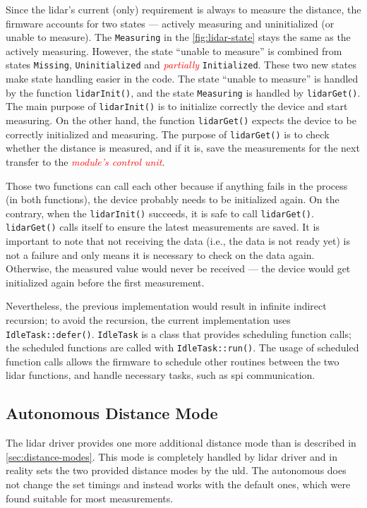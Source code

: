 \documentclass[
  digital,     %
  oneside,     %
  nosansbold,  %
  nocolorbold, %
  nolof,         %
  nolot,         %
]{fithesis4}
\newcommand{\TODO}[1]{\textcolor{red}{\textit{#1}}}
\begin{document}
{{{Since the \acrshort{lidar}'s current (only) requirement is always to measure the distance, the firmware accounts for two states --- actively measuring and uninitialized (or unable to measure). The \verb|Measuring| in the \autoref{fig:lidar-state} stays the same as the actively measuring. However, the state ``unable to measure'' is combined from states \verb|Missing|, \verb|Uninitialized| and \TODO{partially} \verb|Initialized|. These two new states make state handling easier in the code. The state ``unable to measure'' is handled by the function \lstinline|lidarInit()|, and the state \verb|Measuring| is handled by \lstinline|lidarGet()|. The main purpose of \lstinline|lidarInit()| is to initialize correctly the device and start measuring. On the other hand, the function \lstinline|lidarGet()| expects the device to be correctly initialized and measuring. The purpose of \lstinline|lidarGet()| is to check whether the distance is measured, and if it is, save the measurements for the next transfer to the \TODO{module's control unit}.

Those two functions can call each other because if anything fails in the process (in both functions), the device probably needs to be initialized again. On the contrary, when the \lstinline|lidarInit()| succeeds, it is safe to call \lstinline|lidarGet()|. \lstinline|lidarGet()| calls itself to ensure the latest measurements are saved. It is important to note that not receiving the data (i.e., the data is not ready yet) is not a failure and only means it is necessary to check on the data again. Otherwise, the measured value would never be received --- the device would get initialized again before the first measurement.

Nevertheless, the previous implementation would result in infinite indirect recursion; to avoid the recursion, the current implementation uses \lstinline|IdleTask::defer()|. \lstinline|IdleTask| is a class that provides scheduling function calls; the scheduled functions are called with \lstinline[breaklines=false]|IdleTask::run()|. The usage of scheduled function calls allows the firmware to schedule other routines between the two lidar functions, and handle necessary tasks, such as \acrshort{spi} communication.

\subsection{ Autonomous Distance Mode } \label{sec:lidar-autonomous}

The \acrshort{lidar} driver provides one more additional distance mode than is described in \autoref{sec:distance-modes}. This mode is completely handled by \acrshort{lidar} driver and in reality sets the two provided distance modes by the \acrshort{uld}. The autonomous does not change the set timings and instead works with the default ones, which were found suitable for most measurements.

}}}
\end{document}
